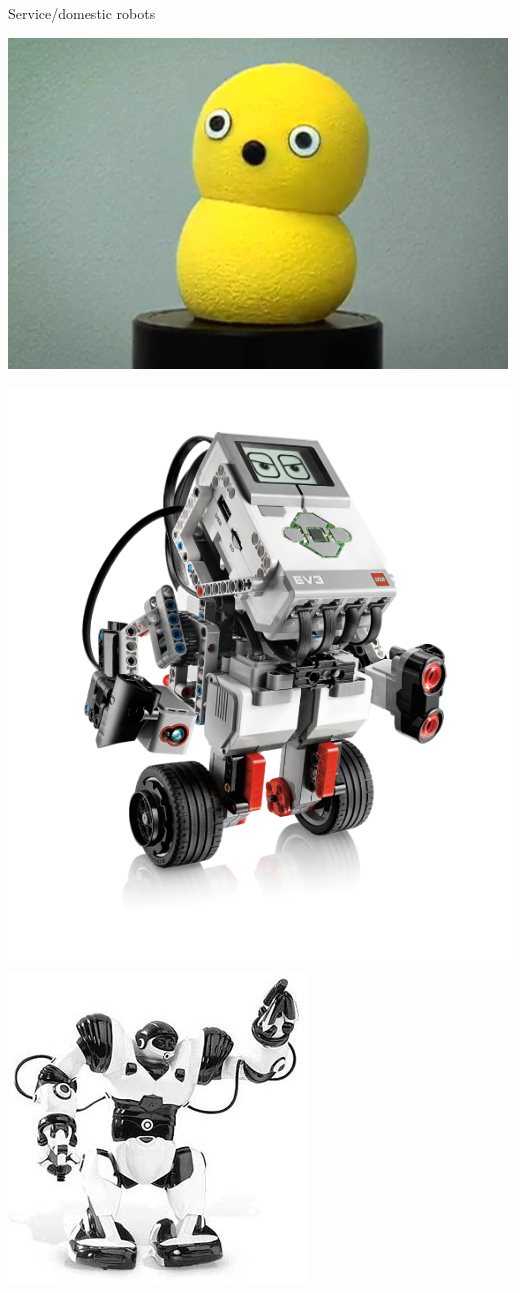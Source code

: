 \documentclass[compress]{beamer}
\begin{document}
\begin{frame}{Service/domestic robots}
\begin{multicols}{2}
\begin{center}
            \includegraphics[width=0.6\linewidth]{keepon}

            \includegraphics[width=0.5\linewidth]{lego-nxt}
            \includegraphics[width=0.5\linewidth]{robosapiens}
        \end{center}
    \end{multicols}
\end{frame}
\end{document}
